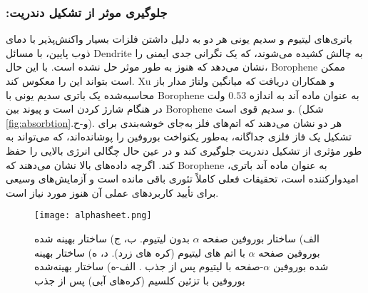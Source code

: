 \subsubsection{:جلوگیری موثر از تشکیل دندریت}
باتری‌های لیتیوم و سدیم یونی هر دو به دلیل داشتن فلزات بسیار واکنش‌پذیر با دمای ذوب پایین، با مسائل \gls{Dendrite} به چالش کشیده می‌شوند، \cite{mortazaviElasticSofteningAlloy2013, chevrierChallengesNaionNegative2011} که یک نگرانی جدی ایمنی را نشان می‌دهد که هنوز به طور موثر حل نشده است. با این حال، \gls{Borophene} ممکن است بتواند این را معکوس کند. \gls{Xu} و همکاران \cite{shiInitioPredictionBorophene2016} دریافت که میانگین ولتاژ مدار باز محاسبه‌شده یک باتری سدیم یونی با \gls{Borophene} به عنوان ماده آند به اندازه $0.53$ ولت در هنگام شارژ کردن است و پیوند بین \gls{Borophene} و سدیم قوی است. (شکل \ref{fig:absorbtion}.و-ح). هر دو نشان می‌دهند که اتم‌های فلز به‌جای خوشه‌بندی برای تشکیل یک فاز فلزی جداگانه، به‌طور یکنواخت بوروفین را پوشانده‌اند، که می‌تواند به طور مؤثری از تشکیل دندریت جلوگیری کند و در عین حال چگالی انرژی بالایی را حفظ کند. اگرچه داده‌های بالا نشان می‌دهند که \gls{Borophene} به عنوان ماده آند باتری،  امیدوارکننده است، تحقیقات فعلی کاملاً تئوری باقی مانده است و آزمایش‌های وسیعی برای تأیید کاربردهای عملی آن هنوز مورد نیاز است.
\begin{figure*}
    \centering
    \texttt{[image: alphasheet.png]}
    \caption{الف) ساختار بوروفین صفحه $\alpha$ بدون لیتیوم. ب، ج) ساختار بهینه شده بوروفین صفحه $\alpha$ با اتم های لیتیوم (کره های زرد). د، ه) ساختار بهینه شده بوروفین $\alpha$-صفحه با لیتیوم پس از جذب . الف-ه) ساختار بهینه‌شده بوروفین با تزئین کلسیم (کره‌های آبی) پس از جذب }
    \label{fig:alphasheet}
\end{figure*}


